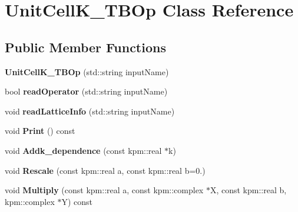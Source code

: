 \hypertarget{classUnitCellK__TBOp}{}\section{Unit\+Cell\+K\+\_\+\+T\+B\+Op Class Reference}
\label{classUnitCellK__TBOp}
\subsection*{Public Member Functions}
\begin{DoxyCompactItemize}
\item 
{\bfseries Unit\+Cell\+K\+\_\+\+T\+B\+Op} (std\+::string input\+Name)\hypertarget{classUnitCellK__TBOp_ab70d5bcc5288f3232d88d814497f077b}{}\label{classUnitCellK__TBOp_ab70d5bcc5288f3232d88d814497f077b}

\item 
bool {\bfseries read\+Operator} (std\+::string input\+Name)\hypertarget{classUnitCellK__TBOp_abdab8ca5cfb7dcc6fef6d3407c18c96f}{}\label{classUnitCellK__TBOp_abdab8ca5cfb7dcc6fef6d3407c18c96f}

\item 
void {\bfseries read\+Lattice\+Info} (std\+::string input\+Name)\hypertarget{classUnitCellK__TBOp_a10b0d1249d27b30d14c0b33b73163ad1}{}\label{classUnitCellK__TBOp_a10b0d1249d27b30d14c0b33b73163ad1}

\item 
void {\bfseries Print} () const \hypertarget{classUnitCellK__TBOp_a62d5b7dd7246640e585d42f92c8eca7c}{}\label{classUnitCellK__TBOp_a62d5b7dd7246640e585d42f92c8eca7c}

\item 
void {\bfseries Addk\+\_\+dependence} (const kpm\+::real $\ast$k)\hypertarget{classUnitCellK__TBOp_acb03b8c265015616900b396776dc9d6d}{}\label{classUnitCellK__TBOp_acb03b8c265015616900b396776dc9d6d}

\item 
void {\bfseries Rescale} (const kpm\+::real a, const kpm\+::real b=0.)\hypertarget{classUnitCellK__TBOp_afe9e68581d0d3a1270cd2277088c6142}{}\label{classUnitCellK__TBOp_afe9e68581d0d3a1270cd2277088c6142}

\item 
void {\bfseries Multiply} (const kpm\+::real a, const kpm\+::complex $\ast$X, const kpm\+::real b, kpm\+::complex $\ast$Y) const \hypertarget{classUnitCellK__TBOp_a1de541609294981b009233bec14b036b}{}\label{classUnitCellK__TBOp_a1de541609294981b009233bec14b036b}


\end{DoxyCompactItemize}
